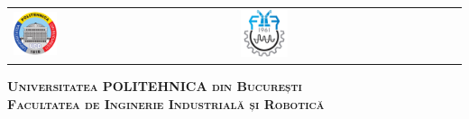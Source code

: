 



\begin{titlepage}
	\centering
	\begin{tabular}{p{6cm}p{3.2cm}}
		\includegraphics[width=0.2\textwidth]{img/upb.png} &
		\includegraphics[width=0.22\textwidth]{img/fiir.png}
	\end{tabular}
	\vspace{1cm}

	{\scshape\Large \textbf{Universitatea POLITEHNICA din București} \\}
	{\scshape\Large \textbf{Facultatea de Inginerie Industrială și Robotică} \\}
	
\end{titlepage}

